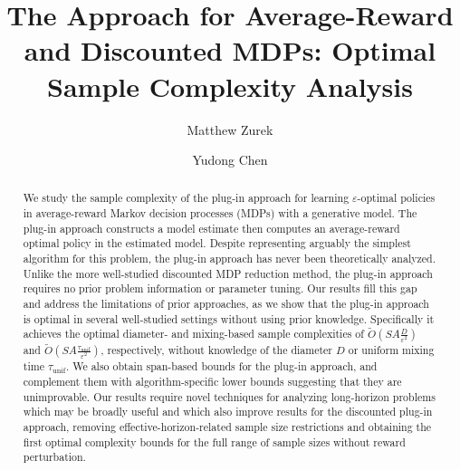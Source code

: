 \documentclass{article}
\date{}
\title{The \Plugin Approach for Average-Reward and Discounted MDPs: Optimal Sample Complexity Analysis}
\author{Matthew Zurek}
\author{Yudong Chen}
\affil{Department of Computer Sciences, University of Wisconsin-Madison\\\texttt{\{matthew.zurek,yudong.chen\}@wisc.edu}}
\theoremstyle{plain}
\theoremstyle{plain}
\theoremstyle{remark}
\theoremstyle{plain}
\theoremstyle{plain}
\newcommand{\plugin}{plug-in\xspace}
\begin{document}
\maketitle

\begin{abstract}%
  We study the sample complexity of the \plugin approach for learning $\varepsilon$-optimal policies in average-reward Markov decision processes (MDPs) with a generative model. The \plugin approach constructs a model estimate then computes an average-reward optimal policy in the estimated model.  Despite representing arguably the simplest algorithm for this problem, the \plugin approach has never been theoretically analyzed. Unlike the more well-studied discounted MDP reduction method, the \plugin approach requires no prior problem information or parameter tuning. Our results fill this gap and address the limitations of prior approaches, as we show that the \plugin approach is optimal in several well-studied settings without using prior knowledge. Specifically it achieves the optimal diameter- and mixing-based sample complexities of $\widetilde{O}\left(SA \frac{D}{\varepsilon^2}\right)$ and $\widetilde{O}\left(SA \frac{\tau_{\mathrm{unif}}}{\varepsilon^2}\right)$, respectively, without knowledge of the diameter $D$ or uniform mixing time $\tau_{\mathrm{unif}}$.
  We also obtain span-based bounds for the \plugin approach, and complement them with algorithm-specific lower bounds suggesting that they are unimprovable. Our results require novel techniques for analyzing long-horizon problems which may be broadly useful and which also improve results for the discounted \plugin approach, removing effective-horizon-related sample size restrictions and obtaining the first optimal complexity bounds for the full range of sample sizes without reward perturbation.%
\end{abstract}
\end{document}
